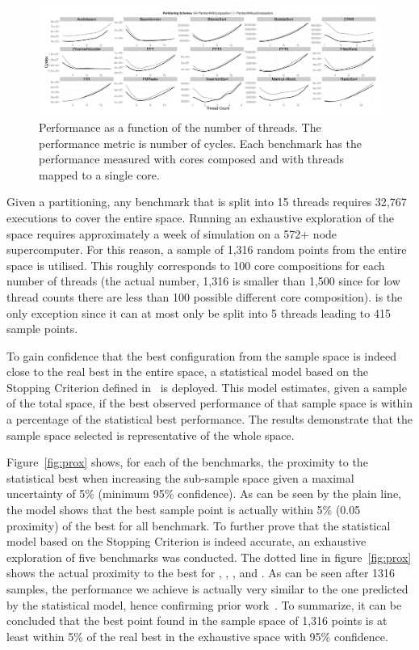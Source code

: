 \begin{figure}[h]
 \centering
    \includegraphics[width=1\textwidth]{streamit-paper/graphics/threadingmaybe.pdf}
    \caption{Performance as a function of the number of threads. The performance metric is number of cycles. Each benchmark has the performance measured with cores composed and with threads mapped to a single core.}\label{fig:threadtrend}
\end{figure}
Given a partitioning, any benchmark that is split into 15 threads requires 32,767 executions to cover the entire space.
Running an exhaustive exploration of the space requires approximately a week of simulation on a 572+ node supercomputer.
For this reason, a sample of 1,316 random points from the entire space is utilised.
This roughly corresponds to 100 core compositions for each number of threads (the actual number, 1,316 is smaller than 1,500 since for low thread counts there are less than 100 possible different core composition).
 is the only exception since it can at most only be split into 5 threads leading to 415 sample points.

To gain confidence that the best configuration from the sample space is indeed close to the real best in the entire space, a statistical model based on the Stopping Criterion defined in~\cite{vuduc2003AutomaticPerf} is deployed.
This model estimates, given a sample of the total space, if the best observed performance of that sample space is within a percentage of the statistical best performance.
The results demonstrate that the sample space selected is representative of the whole space.

Figure~\ref{fig:prox} shows, for each of the benchmarks, the proximity to the statistical best when increasing the sub-sample space given a maximal uncertainty of 5\%  (\ie minimum 95\% confidence).
As can be seen by the plain line, the model shows that the best sample point is actually within 5\% (0.05 proximity) of the best for all benchmark.
To further prove that the statistical model based on the Stopping Criterion is indeed accurate, an exhaustive exploration of five benchmarks was conducted.
The dotted line in figure~\ref{fig:prox} shows the actual proximity to the best for , , ,  and .
As can be seen after 1316 samples, the performance we achieve is actually very similar to the one predicted by the statistical model, hence confirming prior work~\cite{vuduc2003AutomaticPerf}.
To summarize, it can be concluded that the best point found in the sample space of 1,316 points is at least within 5\% of the real best in the exhaustive space with 95\% confidence.